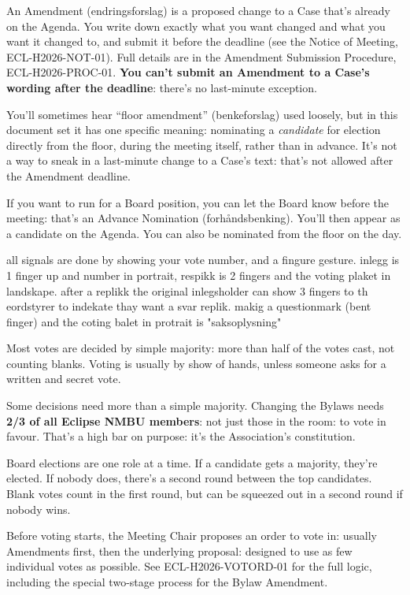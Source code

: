 \documentclass{../../../Common/Latex/Templates/rapport}
\begin{document}
An Amendment (endringsforslag) is a proposed change to a Case that's already on the Agenda. You write down exactly what you want changed and what you want it changed to, and submit it before the deadline (see the Notice of Meeting, ECL-H2026-NOT-01). Full details are in the Amendment Submission Procedure, ECL-H2026-PROC-01. \textbf{You can't submit an Amendment to a Case's wording after the deadline}: there's no last-minute exception.

You'll sometimes hear ``floor amendment'' (benkeforslag) used loosely, but in this document set it has one specific meaning: nominating a \emph{candidate} for election directly from the floor, during the meeting itself, rather than in advance. It's not a way to sneak in a last-minute change to a Case's text: that's not allowed after the Amendment deadline.

If you want to run for a Board position, you can let the Board know before the meeting: that's an Advance Nomination (forhåndsbenking). You'll then appear as a candidate on the Agenda. You can also be nominated from the floor on the day.

all signals are done by showing your vote number, and a fingure gesture. inlegg is 1 finger up and number in portrait, respikk is 2 fingers and the voting plaket in landskape. after a replikk the original inlegsholder can show 3 fingers to th eordstyrer to indekate thay want a svar replik. makig a questionmark (bent finger) and the coting balet in protrait is "saksoplysning"


Most votes are decided by simple majority: more than half of the votes cast, not counting blanks. Voting is usually by show of hands, unless someone asks for a written and secret vote.

Some decisions need more than a simple majority. Changing the Bylaws needs \textbf{2/3 of all Eclipse NMBU members}: not just those in the room: to vote in favour. That's a high bar on purpose: it's the Association's constitution.

Board elections are one role at a time. If a candidate gets a majority, they're elected. If nobody does, there's a second round between the top candidates. Blank votes count in the first round, but can be squeezed out in a second round if nobody wins.

Before voting starts, the Meeting Chair proposes an order to vote in: usually Amendments first, then the underlying proposal: designed to use as few individual votes as possible. See ECL-H2026-VOTORD-01 for the full logic, including the special two-stage process for the Bylaw Amendment.
\end{document}
